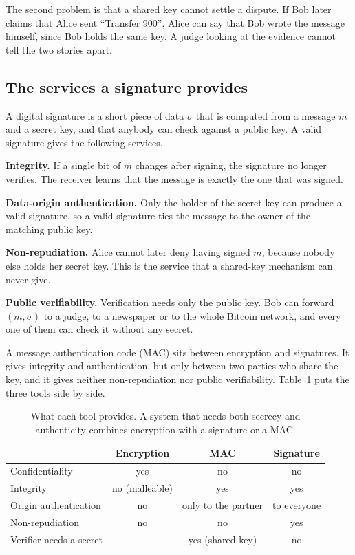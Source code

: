\documentclass[11pt,a4paper]{article}
\theoremstyle{definition}
\begin{document}
The second problem is that a shared key cannot settle a dispute. If Bob later claims that Alice sent ``Transfer 900'', Alice can say that Bob wrote the message himself, since Bob holds the same key. A judge looking at the evidence cannot tell the two stories apart.

\subsection{The services a signature provides}

A digital signature is a short piece of data $\sigma$ that is computed from a message $m$ and a secret key, and that anybody can check against a public key. A valid signature gives the following services.

\textbf{Integrity.} If a single bit of $m$ changes after signing, the signature no longer verifies. The receiver learns that the message is exactly the one that was signed.

\textbf{Data-origin authentication.} Only the holder of the secret key can produce a valid signature, so a valid signature ties the message to the owner of the matching public key.

\textbf{Non-repudiation.} Alice cannot later deny having signed $m$, because nobody else holds her secret key. This is the service that a shared-key mechanism can never give.

\textbf{Public verifiability.} Verification needs only the public key. Bob can forward $(m,\sigma)$ to a judge, to a newspaper or to the whole Bitcoin network, and every one of them can check it without any secret.

A message authentication code (MAC) sits between encryption and signatures. It gives integrity and authentication, but only between two parties who share the key, and it gives neither non-repudiation nor public verifiability. Table~\ref{tab:services} puts the three tools side by side.

\begin{table}[h]
\centering
\begin{tabular}{lccc}
\toprule
 & Encryption & MAC & Signature\\
\midrule
Confidentiality & yes & no & no\\
Integrity & no (malleable) & yes & yes\\
Origin authentication & no & only to the partner & to everyone\\
Non-repudiation & no & no & yes\\
Verifier needs a secret & --- & yes (shared key) & no\\
\bottomrule
\end{tabular}
\caption{What each tool provides. A system that needs both secrecy and authenticity combines encryption with a signature or a MAC.}\label{tab:services}
\end{table}
\end{document}
